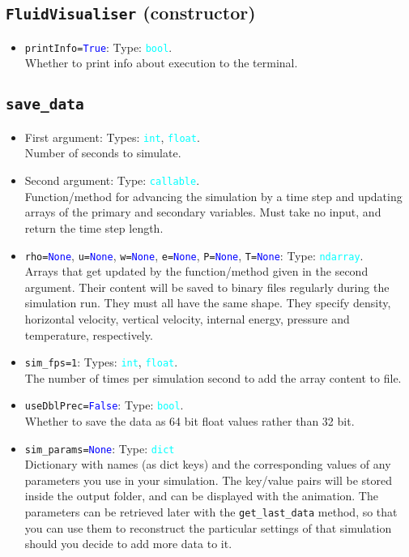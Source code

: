 \documentclass{article}
\newcommand{\ttt}[1]{\texttt{#1}}
\newcommand{\ptype}[1]{\texttt{\textcolor{cyan}{#1}}}
\newcommand{\cbl}[1]{\textcolor{blue}{#1}}
\newcommand{\cro}[1]{\textcolor{RedOrange}{#1}}
\begin{document}
\subsection{\ttt{FluidVisualiser} (constructor)}
\label{sec:const}
\begin{itemize}
	\item \ttt{\cro{printInfo}=\cbl{True}}: Type: \ptype{bool}.\\Whether to print info about execution to the terminal.
\end{itemize}

\subsection{\ttt{save\_data}}
\label{sec:sd}
\begin{itemize}
	\item First argument: Types: \ptype{int}, \ptype{float}.\\Number of seconds to simulate.
	\item Second argument: Type: \ptype{callable}.\\Function/method for advancing the simulation by a time step and updating arrays of the primary and secondary variables. Must take no input, and return the time step length.
	\item \ttt{\cro{rho}=\cbl{None}}, \ttt{\cro{u}=\cbl{None}}, \ttt{\cro{w}=\cbl{None}}, \ttt{\cro{e}=\cbl{None}}, \ttt{\cro{P}=\cbl{None}}, \ttt{\cro{T}=\cbl{None}}: Type: \ptype{ndarray}.\\Arrays that get updated by the function/method given in the second argument. Their content will be saved to binary files regularly during the simulation run. They must all have the same shape. They specify density, horizontal velocity, vertical velocity, internal energy, pressure and temperature, respectively.
	\item \ttt{\cro{sim\_fps}=1}: Types: \ptype{int}, \ptype{float}.\\The number of times per simulation second to add the array content to file.
	\item \ttt{\cro{useDblPrec}=\cbl{False}}: Type: \ptype{bool}.\\Whether to save the data as 64 bit float values rather than 32 bit.
	\item \ttt{\cro{sim\_params}=\cbl{None}}: Type: \ptype{dict}\\Dictionary with names (as dict keys) and the corresponding values of any parameters you use in your simulation. The key/value pairs will be stored inside the output folder, and can be displayed with the animation. The parameters can be retrieved later with the \ttt{get\_last\_data} method, so that you can use them to reconstruct the particular settings of that simulation should you decide to add more data to it.

\end{itemize}
\end{document}
